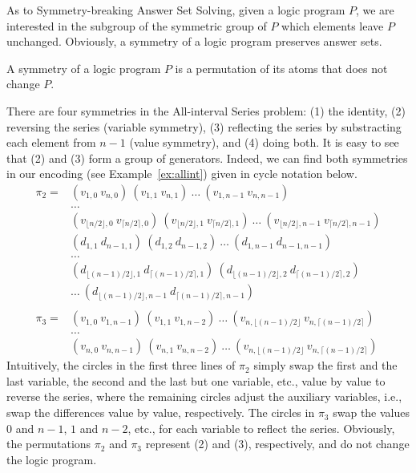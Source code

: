 \documentclass[envcountsame]{llncs}
\begin{document}
As to Symmetry-breaking Answer Set Solving, given a logic program $P$, we are interested in the subgroup of the symmetric group of $P$ which elements leave $P$ unchanged. Obviously, a symmetry of a logic program preserves answer sets.
\begin{definition}
A symmetry of a logic program $P$ is a permutation of its atoms that does not change $P$.
\end{definition}

\begin{example} \label{ex:allintsym}
There are four symmetries in the All-interval Series problem: (1) the identity, (2) reversing the series (variable symmetry), (3) reflecting the series by substracting each element from $n-1$ (value symmetry), and (4) doing both. It is easy to see that (2) and (3) form a group of generators. Indeed, we can find both symmetries in our encoding (see Example~\ref{ex:allint}) given in cycle notation below.
\[
\begin{array}{ll}
\pi_2 =& (v_{1,0}\ v_{n,0})\ (v_{1,1}\ v_{n,1})\ \dots\ (v_{1,n-1}\ v_{n,n-1})\\
       & \dots \\
       & (v_{\lfloor n/2 \rfloor,0}\ v_{\lceil n/2 \rceil,0})\ (v_{\lfloor n/2 \rfloor,1}\ v_{\lceil n/2 \rceil,1})\ \dots\ (v_{\lfloor n/2 \rfloor,n-1}\ v_{\lceil n/2 \rceil,n-1}) \\
       & (d_{1,1}\ d_{n-1,1})\ (d_{1,2}\ d_{n-1,2})\ \dots\ (d_{1,n-1}\ d_{n-1,n-1}) \\
       & \dots \\
       & (d_{\lfloor (n-1)/2 \rfloor,1}\ d_{\lceil (n-1)/2 \rceil,1})\ (d_{\lfloor (n-1)/2 \rfloor,2}\ d_{\lceil (n-1)/2 \rceil,2})\ \\
       & \dots\ (d_{\lfloor (n-1)/2 \rfloor,n-1}\ d_{\lceil (n-1)/2 \rceil,n-1}) \\ \\
\pi_3 =& (v_{1,0}\ v_{1,n-1})\ (v_{1,1}\ v_{1,n-2})\ \dots\ (v_{n,\lfloor (n-1)/2 \rfloor}\ v_{n,\lceil (n-1)/2 \rceil})\\
       & \dots \\
       & (v_{n,0}\ v_{n,n-1})\ (v_{n,1}\ v_{n,n-2})\ \dots\ (v_{n,\lfloor (n-1)/2 \rfloor}\ v_{n,\lceil (n-1)/2 \rceil})
\end{array}
\]
Intuitively, the circles in the first three lines of $\pi_2$ simply swap the first and the last variable, the second and the last but one variable, etc., value by value to reverse the series, where the remaining circles adjust the auxiliary variables, i.e., swap the differences value by value, respectively. The circles in $\pi_3$ swap the values $0$ and $n-1$, $1$ and $n-2$, etc., for each variable to reflect the series. Obviously, the permutations $\pi_2$ and $\pi_3$ represent (2) and (3), respectively, and do not change the logic program.
\end{example}
\end{document}
